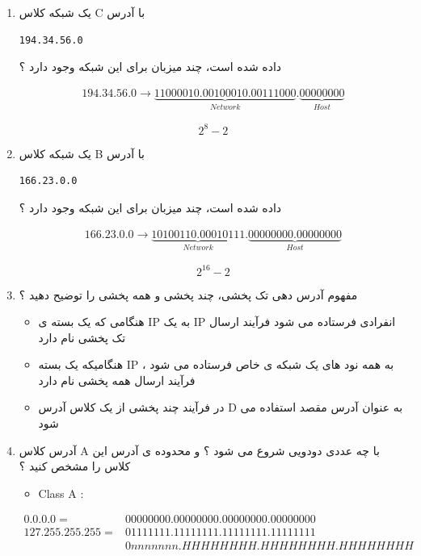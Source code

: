 \documentclass{article}
\begin{document}
\begin{enumerate}
\item یک شبکه کلاس C با آدرس 
\begin{lstlisting}
194.34.56.0
\end{lstlisting}
داده شده است، چند میزبان برای  این شبکه وجود دارد ؟ 

\begin{tcolorbox}
\begin{align*}
194.34.56.0 \to \underbrace{11000010.00100010.00111000}_{Network}.\underbrace{00000000}_{Host}
\end{align*}

{
\LARGE
$$
2^{8} - 2
$$
}
\end{tcolorbox}

\newpage

\item یک شبکه کلاس B با آدرس 
\begin{lstlisting}
166.23.0.0
\end{lstlisting}
داده شده است، چند میزبان برای  این شبکه وجود دارد ؟ 

\begin{tcolorbox}
\begin{align*}
166.23.0.0 \to \underbrace{10100110.00010111}_{Network}.\underbrace{00000000.00000000}_{Host}
\end{align*}

{
\LARGE
$$
2^{16} - 2
$$
}
\end{tcolorbox}



\item مفهوم آدرس دهی تک پخشی، چند پخشی و همه پخشی را توضیح دهید ؟

\begin{tcolorbox}
\begin{itemize}
	\item هنگامی که یک بسته ی IP به یک IP
	انفرادی فرستاده می شود فرآیند ارسال تک پخشی نام دارد
	\item هنگامیکه یک بسته IP به همه نود های یک شبکه ی خاص فرستاده می شود ، فرآیند ارسال همه پخشی نام دارد 
	\item در فرآیند چند پخشی از یک کلاس آدرس D
	به عنوان آدرس مقصد استفاده می شود 
\end{itemize}
\end{tcolorbox}

\item آدرس کلاس A با چه عددی دودویی شروع می شود ؟ و محدوده ی آدرس این کلاس را مشخص کنید ؟

\begin{tcolorbox}
\begin{latin}
\begin{itemize}
	\item Class A :
\end{itemize}
\end{latin}
\begin{align*}
 0.  0.  0.  0 = &00000000.00000000.00000000.00000000 \\
127.255.255.255 = &01111111.11111111.11111111.11111111 \\
                  &0nnnnnnn.HHHHHHHH.HHHHHHHH.HHHHHHHH
\end{align*}
\end{tcolorbox}




\end{enumerate}
\end{document}
